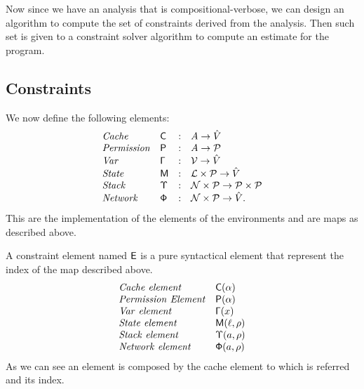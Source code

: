 Now since we have an analysis that is compositional-verbose, we can design an algorithm to compute the set of constraints derived from the analysis. Then such set is given to a constraint solver algorithm to compute an estimate for the program.

\subsection{Constraints}
We now define the following elements:
\[
\begin{array}{llcl}
\mathit{Cache}      & \mathsf{C}   & : & A \rightarrow \hat{V} \\
\mathit{Permission} & \mathsf{P}   & : & A \rightarrow \mathcal{P}\\
\mathit{Var}        & \mathsf{\Gamma}   & : & \mathcal{V} \rightarrow \hat{V} \\
\mathit{State}      & \mathsf{M}   & : & {\mathcal L} \times \mathcal{P} \rightarrow \hat{V} \\
\mathit{Stack}      & \mathsf{\Upsilon} & : & \mathcal{N} \times \mathcal{P} \rightarrow \mathcal{P} \times \mathcal{P} \\
\mathit{Network}    & \mathsf{\Phi} & : & \mathcal{N} \times \mathcal{P} \rightarrow \hat{V}.
\end{array}
\]
This are the implementation of the elements of the environments and are maps as described above.

A constraint element named $\mathsf{E}$ is a pure syntactical element that represent the index of the map described above.
\[
\begin{array}{llcl}
\mathit{Cache\ element}      & \Cel(\all)       \\ %
\mathit{Permission\ Element} & \Pel(\all)       \\ %
\mathit{Var\ element}        & \Rel(x)          \\ %
\mathit{State\ element}      & \Mel(\ell, \rho) \\ %
\mathit{Stack\ element}      & \Upsel(a, \rho)  \\ %
\mathit{Network\ element}    & \Phiel(a, \rho)  \\ %
\end{array}
\]
As we can see an element is composed by the cache element to which is referred and its index.

